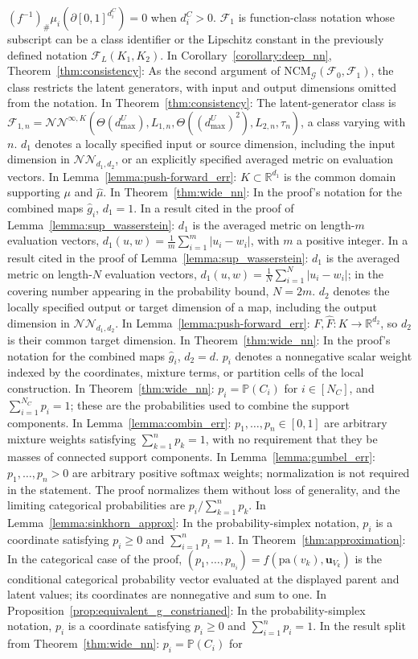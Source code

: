 \documentclass[12pt]{article}
\theoremstyle{plain}
\theoremstyle{definition}
\theoremstyle{remark}
\begin{document}
$(f^{-1})_{\#}\mu_i(\partial[0,1]^{d_i^C})=0$ when $d_i^C>0$. $\mathcal{F}_1$ is function-class notation whose subscript can be a class identifier or the Lipschitz constant in the previously defined notation $\mathcal{F}_L(K_1,K_2)$. In Corollary~\ref{corollary:deep_nn}, Theorem~\ref{thm:consistency}: As the second argument of $\text{NCM}_{\mathcal{G}}(\mathcal{F}_0,\mathcal{F}_1)$, the class restricts the latent generators, with input and output dimensions omitted from the notation. In Theorem~\ref{thm:consistency}: The latent-generator class is $\mathcal{F}_{1,n}=\mathcal{NN}^{\infty,K}(\Theta(d_{\max}^U),L_{1,n},\Theta((d_{\max}^U)^2),L_{2,n},\tau_n)$, a class varying with $n$. $d_1$ denotes a locally specified input or source dimension, including the input dimension in $\mathcal{NN}_{d_1,d_2}$, or an explicitly specified averaged metric on evaluation vectors. In Lemma~\ref{lemma:push-forward_err}: $K\subset\mathbb{R}^{d_1}$ is the common domain supporting $\mu$ and $\hat{\mu}$. In Theorem~\ref{thm:wide_nn}: In the proof's notation for the combined maps $\hat{g}_i$, $d_1=1$. In a result cited in the proof of Lemma~\ref{lemma:sup_wasserstein}: $d_1$ is the averaged metric on length-$m$ evaluation vectors, $d_1(u,w)=\frac1m\sum_{i=1}^m|u_i-w_i|$, with $m$ a positive integer. In a result cited in the proof of Lemma~\ref{lemma:sup_wasserstein}: $d_1$ is the averaged metric on length-$N$ evaluation vectors, $d_1(u,w)=\frac1N\sum_{i=1}^N|u_i-w_i|$; in the covering number appearing in the probability bound, $N=2m$. $d_2$ denotes the locally specified output or target dimension of a map, including the output dimension in $\mathcal{NN}_{d_1,d_2}$. In Lemma~\ref{lemma:push-forward_err}: $F,\hat{F}:K\rightarrow\mathbb{R}^{d_2}$, so $d_2$ is their common target dimension. In Theorem~\ref{thm:wide_nn}: In the proof's notation for the combined maps $\hat{g}_i$, $d_2=d$. $p_i$ denotes a nonnegative scalar weight indexed by the coordinates, mixture terms, or partition cells of the local construction. In Theorem~\ref{thm:wide_nn}: $p_i=\mathbb{P}(C_i)$ for $i\in[N_C]$, and $\sum_{i=1}^{N_C}p_i=1$; these are the probabilities used to combine the support components. In Lemma~\ref{lemma:combin_err}: $p_1,\ldots,p_n\in[0,1]$ are arbitrary mixture weights satisfying $\sum_{k=1}^n p_k=1$, with no requirement that they be masses of connected support components. In Lemma~\ref{lemma:gumbel_err}: $p_1,\ldots,p_n>0$ are arbitrary positive softmax weights; normalization is not required in the statement. The proof normalizes them without loss of generality, and the limiting categorical probabilities are $p_i/\sum_{k=1}^n p_k$. In Lemma~\ref{lemma:sinkhorn_approx}: In the probability-simplex notation, $p_i$ is a coordinate satisfying $p_i\geqslant0$ and $\sum_{i=1}^n p_i=1$. In Theorem~\ref{thm:approximation}: In the categorical case of the proof, $(p_1,\ldots,p_{n_i})=f(\text{pa}(v_k),\boldsymbol{u}_{V_k})$ is the conditional categorical probability vector evaluated at the displayed parent and latent values; its coordinates are nonnegative and sum to one. In Proposition~\ref{prop:equivalent_g_constrianed}: In the probability-simplex notation, $p_i$ is a coordinate satisfying $p_i\geqslant0$ and $\sum_{i=1}^n p_i=1$. In the result split from Theorem~\ref{thm:wide_nn}: $p_i=\mathbb P(C_i)$ for 
\end{document}

